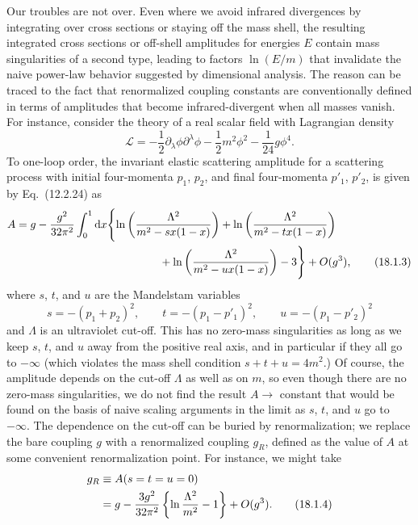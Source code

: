 Our troubles are not over. Even where we avoid infrared divergences by
integrating over cross sections or staying off the mass shell, the resulting
integrated cross sections or off-shell amplitudes for energies $E$ contain
mass singularities of a second type, leading to factors $\ln(E/m)$ that
invalidate the naive power-law behavior suggested by dimensional analysis.
The reason can be traced to the fact that renormalized coupling constants are
conventionally defined in terms of amplitudes that become infrared-divergent
when all masses vanish. For instance, consider the theory of a real scalar
field with Lagrangian density
\begin{equation}
 \mathcal{L}=-\frac{1}{2}\partial_\lambda\phi\partial^\lambda\phi
 -\frac{1}{2}m^2\phi^2-\frac{1}{24}g\phi^4 .
 \tag{18.1.2}
 \label{eq:18.1.2}
\end{equation}
To one-loop order, the invariant elastic scattering amplitude for a
scattering process with initial four-momenta $p_1$, $p_2$, and final
four-momenta $p'_1$, $p'_2$, is given by Eq.~(12.2.24) as
\begin{align}
 A={}&g-\frac{g^2}{32\pi^2}\int_0^1\dd x\Biggl\{
 \ln\left(\frac{\Lambda^2}{m^2-sx(1-x)}\right)
 +\ln\left(\frac{\Lambda^2}{m^2-tx(1-x)}\right) \notag\\
 &\hspace{41mm}
 +\ln\left(\frac{\Lambda^2}{m^2-ux(1-x)}\right)-3\Biggr\}
 +O(g^3) ,
 \tag{18.1.3}
 \label{eq:18.1.3}
\end{align}
where $s$, $t$, and $u$ are the Mandelstam variables
\[
 s=-(p_1+p_2)^2,\qquad t=-(p_1-p'_1)^2,\qquad
 u=-(p_1-p'_2)^2
\]
and $\Lambda$ is an ultraviolet cut-off. This has no zero-mass singularities
as long as we keep $s$, $t$, and $u$ away from the positive real axis, and in
particular if they all go to $-\infty$ (which violates the mass shell
condition $s+t+u=4m^2$.) Of course, the amplitude depends on the cut-off
$\Lambda$ as well as on $m$, so even though there are no zero-mass
singularities, we do not find the result $A\to$ constant that would be found
on the basis of naive scaling arguments in the limit as $s$, $t$, and $u$ go
to $-\infty$. The dependence on the cut-off can be buried by renormalization;
we replace the bare coupling $g$ with a renormalized coupling $g_R$, defined
as the value of $A$ at some convenient renormalization point. For instance,
we might take
\begin{align}
 g_R&\equiv A(s=t=u=0) \notag\\
 &=g-\frac{3g^2}{32\pi^2}\left\{\ln\frac{\Lambda^2}{m^2}-1\right\}
 +O(g^3) .
 \tag{18.1.4}
 \label{eq:18.1.4}
\end{align}
